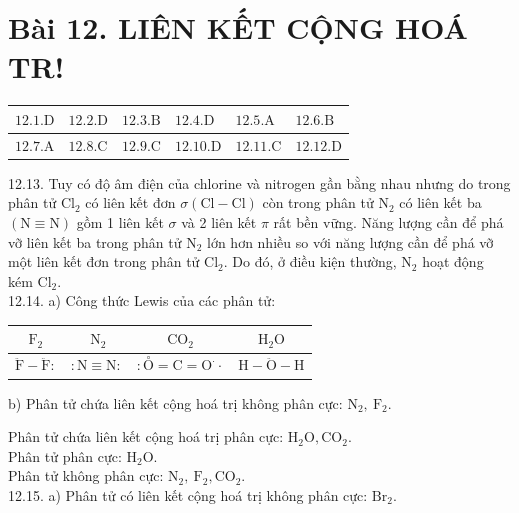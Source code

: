 \documentclass[10pt]{article}
\begin{document}
\section*{Bài 12. LIÊN KẾT CỘNG HOÁ TR!}
\begin{center}
\begin{tabular}{|l|l|l|l|l|l|}
\hline
$12.1 . \mathrm{D}$ & $12.2 . \mathrm{D}$ & $12.3 . \mathrm{B}$ & $12.4 . \mathrm{D}$ & $12.5 . \mathrm{A}$ & $12.6 . \mathrm{B}$ \\
\hline
$12.7 . \mathrm{A}$ & $12.8 . \mathrm{C}$ & $12.9 . \mathrm{C}$ & $12.10 . \mathrm{D}$ & $12.11 . \mathrm{C}$ & $12.12 . \mathrm{D}$ \\
\hline
\end{tabular}
\end{center}

12.13. Tuy có độ âm điện của chlorine và nitrogen gần bằng nhau nhưng do trong phân tử $\mathrm{Cl}_{2}$ có liên kết đơn $\sigma(\mathrm{Cl}-\mathrm{Cl})$ còn trong phân tử $\mathrm{N}_{2}$ có liên kết ba $(\mathrm{N} \equiv \mathrm{N})$ gồm 1 liên kết $\sigma$ và 2 liên kết $\pi$ rất bền vững. Năng lượng cần để phá vỡ liên kết ba trong phân tử $\mathrm{N}_{2}$ lớn hơn nhiều so với năng lượng cần để phá vỡ một liên kết đơn trong phân tử $\mathrm{Cl}_{2}$. Do đó, ở điều kiện thường, $\mathrm{N}_{2}$ hoạt động kém $\mathrm{Cl}_{2}$.\\
12.14. a) Công thức Lewis của các phân tử:

\begin{center}
\begin{tabular}{|c|c|c|c|}
\hline
$\mathrm{F}_{2}$ & $\mathrm{~N}_{2}$ & $\mathrm{CO}_{2}$ & $\mathrm{H}_{2} \mathrm{O}$ \\
\hline
$\ddot{\mathrm{F}}-\ddot{\mathrm{F}}:$ & $: \mathrm{N} \equiv \mathrm{N}:$ & $: \stackrel{\circ}{\mathrm{O}}=\mathrm{C}=\mathrm{O}^{\cdot} \cdot$ & $\mathrm{H}-\ddot{\mathrm{O}}-\mathrm{H}$ \\
\hline
\end{tabular}
\end{center}

b) Phân tử chứa liên kết cộng hoá trị không phân cực: $\mathrm{N}_{2}, \mathrm{~F}_{2}$.

Phân tử chứa liên kết cộng hoá trị phân cực: $\mathrm{H}_{2} \mathrm{O}, \mathrm{CO}_{2}$.\\
Phân tử phân cực: $\mathrm{H}_{2} \mathrm{O}$.\\
Phân tử không phân cực: $\mathrm{N}_{2}, \mathrm{~F}_{2}, \mathrm{CO}_{2}$.\\
12.15. a) Phân tử có liên kết cộng hoá trị không phân cực: $\mathrm{Br}_{2}$.
\end{document}
